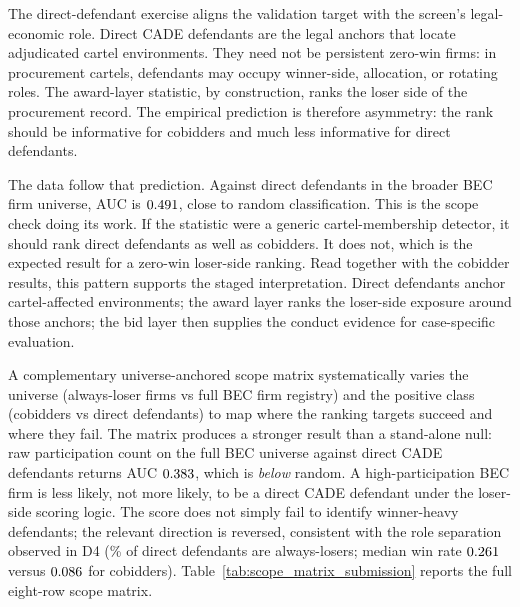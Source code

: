 The direct-defendant exercise aligns the validation target with
the screen's legal-economic role. Direct CADE defendants are the
legal anchors that locate adjudicated cartel environments. They
need not be persistent zero-win firms: in procurement cartels,
defendants may occupy winner-side, allocation, or rotating roles.
The award-layer statistic, by construction, ranks the loser side
of the procurement record. The empirical prediction is therefore
asymmetry: the rank should be informative for cobidders and much
less informative for direct defendants.

The data follow that prediction. Against direct defendants in
the broader BEC firm universe, AUC is $0.491$, close
to random classification. This is the scope check doing its
work. If the statistic were a generic cartel-membership detector,
it should rank direct defendants as well as cobidders. It does
not, which is the expected result for a zero-win loser-side
ranking. Read together with the cobidder results, this pattern
supports the staged interpretation. Direct defendants anchor
cartel-affected environments; the award layer ranks the
loser-side exposure around those anchors; the bid layer then
supplies the conduct evidence for case-specific evaluation.

A complementary universe-anchored scope matrix systematically
varies the universe (always-loser firms vs full BEC firm
registry) and the positive class (cobidders vs direct defendants)
to map where the ranking targets succeed and where they fail. The
matrix produces a stronger result than a stand-alone null: raw
participation count on the full BEC universe against direct CADE
defendants returns AUC $0.383$, which is
\emph{below} random. A high-participation BEC firm is less
likely, not more likely, to be a direct CADE defendant under the
loser-side scoring logic. The score does not simply fail to
identify winner-heavy defendants; the relevant direction is
reversed, consistent with the role separation observed in D4
(\valDirectShareAL\% of direct defendants are always-losers; median win rate
$0.261$ versus $0.086$ for cobidders).
Table~\ref{tab:scope_matrix_submission} reports the full eight-row
scope matrix.


